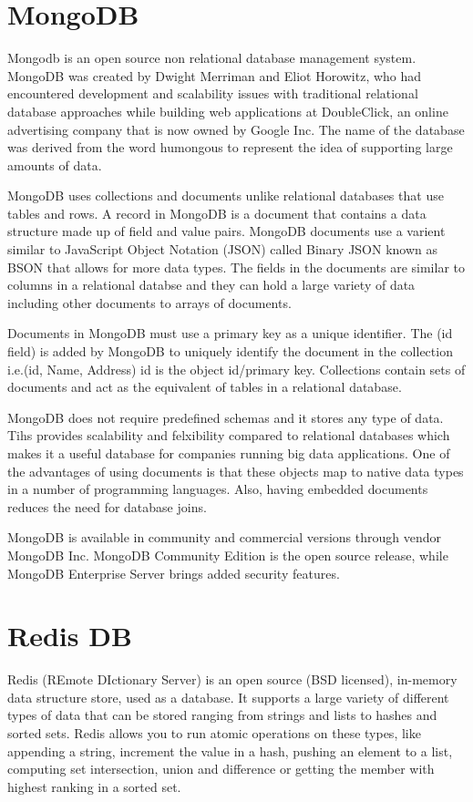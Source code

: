 \section {MongoDB}
Mongodb is an open source non relational database management system. MongoDB was created by Dwight Merriman and Eliot Horowitz, who had encountered development and scalability issues with traditional relational database approaches while building web applications at DoubleClick, an online advertising company that is now owned by Google Inc. The name of the database was derived from the word humongous to represent the idea of supporting large amounts of data.\newline

MongoDB uses collections and documents unlike relational databases that use tables and rows. A record in MongoDB is a document that contains a data structure made up of field and value pairs. MongoDB documents use a varient similar to JavaScript Object Notation (JSON) called Binary JSON known as BSON that allows for more data types. The fields in the documents are similar to columns in a relational databse and they can hold a large variety of data including other documents to arrays of documents.\newline

Documents in MongoDB must use a primary key as a unique identifier.
The (id field) is added by MongoDB to uniquely identify the document in the collection i.e.(id, Name, Address) id is the object id/primary key. Collections contain sets of documents and act as the equivalent of tables in a relational database.\newline

MongoDB does not require predefined schemas and it stores any type of data. Tihs provides scalability and felxibility compared to relational databases which makes it a useful database for companies running big data applications. One of the advantages of using documents is that these objects map to native data types in a number of programming languages. Also, having embedded documents reduces the need for database joins.\newline

MongoDB is available in community and commercial versions through vendor MongoDB Inc. MongoDB Community Edition is the open source release, while MongoDB Enterprise Server brings added security features.\newline
\cite{S174228761630031720160601}

\section {Redis DB}
Redis (REmote DIctionary Server) is an open source (BSD licensed), in-memory data structure store, used as a database. It supports a large variety of different types of data that can be stored ranging from strings and lists to hashes and sorted sets. Redis allows you to run atomic operations on these types, like appending a string, increment the value in a hash, pushing an element to a list, computing set intersection, union and difference or getting the member with highest ranking in a sorted set.
\newline

